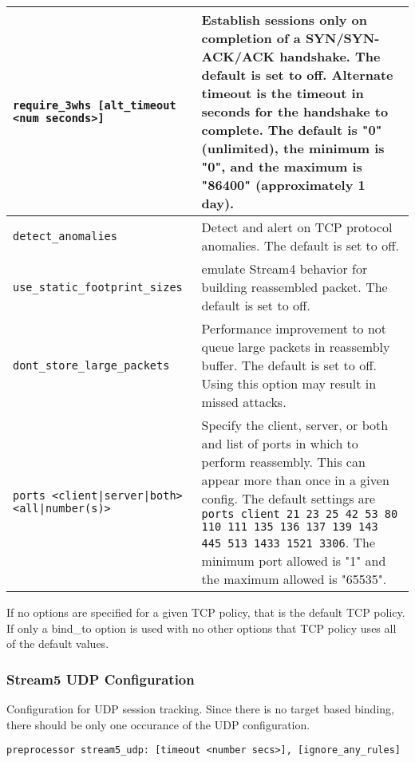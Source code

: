\documentclass[english]{report}
\newenvironment{note}{
\samepage
    \vspace{10pt}{\textsf{
        {\hspace{7pt}\Huge{$\triangle$\hspace{-12.5pt}{\Large{$^!$}}}}\hspace{5pt}
        {\Large{NOTE}}
    }
    }
   \begin{center}
    \par\vspace{-17pt}

    \begin{lrbox}{\savepar}
    \begin{minipage}[r]{6in}
}
{
    \end{minipage}
    \end{lrbox}
    \fbox{
        \usebox{
            \savepar
	}
    }
    \par\vskip10pt
    \end{center}
}
\newenvironment{note}{
        \begin{rawhtml}
        <p><table border="1"><tr><td><b>
        Note:&nbsp;&nbsp;</b>
        \end{rawhtml}
}{
        \begin{rawhtml}
        </b></td></tr></table></p>
        \end{rawhtml}
}
\begin{document}
\begin{tabular}{| l | p{3.5in} |}
\hline
\texttt{require\_3whs [alt\_timeout <num seconds>]} & Establish sessions only on completion of a SYN/SYN-ACK/ACK handshake.  The default is set to off.  Alternate timeout is the timeout in seconds for the handshake to complete.  The default is "0" (unlimited), the minimum is "0", and the maximum is "86400" (approximately 1 day).\\
\hline
\texttt{detect\_anomalies} & Detect and alert on TCP protocol anomalies.  The default is set to off.\\
\hline
\texttt{use\_static\_footprint\_sizes} & emulate Stream4 behavior for building reassembled packet.  The default is set to off.\\
\hline
\texttt{dont\_store\_large\_packets} & Performance improvement to not queue large packets in reassembly buffer.  The default is set to off.  Using this option may result in missed attacks.\\
\hline
\texttt{ports <client|server|both> <all|number(s)>} & 
Specify the client, server, or both and list of ports in which to perform reassembly.  This can appear more than once in a given config.  The default settings are \texttt{ports client 21 23 25 42 53 80 110 111 135 136 137 139 143 445 513 1433 1521 3306}.  The minimum port allowed is "1" and the maximum allowed is "65535".\\
\hline
\end{tabular}

\begin{note}
If no options are specified for a given TCP policy, that is the default
TCP policy.  If only a bind\_to option is used with no other options that
TCP policy uses all of the default values.
\end{note}

\subsubsection{Stream5 UDP Configuration}

Configuration for UDP session tracking.  Since there is no target based
binding, there should be only one occurance of the UDP configuration.

\begin{verbatim}
preprocessor stream5_udp: [timeout <number secs>], [ignore_any_rules]
\end{verbatim}
\end{document}
